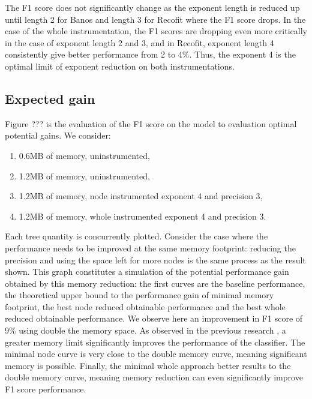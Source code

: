 \documentclass[conference]{IEEEtran}
\begin{document}
The F1 score does not significantly change as the exponent length is reduced up
until length 2 for Banos and length 3 for Recofit where the F1 score drops. In
the case of the whole instrumentation, the F1 scores are dropping even more
critically in the case of exponent length 2 and 3, and in Recofit, exponent
length 4 consistently give better performance from 2 to 4\%. Thus, the exponent
4 is the optimal limit of exponent reduction on both instrumentations.

\subsection{Expected gain}

Figure ??? is the evaluation of the F1 score on the model to evaluation optimal
potential gains. We consider:

\begin{enumerate}
    \item 0.6MB of memory, uninstrumented,
    \item 1.2MB of memory, uninstrumented,
    \item 1.2MB of memory, node instrumented exponent 4 and precision 3,
    \item 1.2MB of memory, whole instrumented exponent 4 and precision 3.
\end{enumerate}

Each tree quantity is concurrently plotted. Consider the case where the
performance needs to be improved at the same memory footprint: reducing the
precision and using the space left for more nodes is the same process as the
result shown. This graph constitutes a simulation of the potential performance
gain obtained by this memory reduction: the first curves are the baseline
performance, the theoretical upper bound to the performance gain of minimal
memory footprint, the best node reduced obtainable performance and the best
whole reduced obtainable performance.
We observe here an improvement in F1 score of 9\% using double the memory space.
As observed in the previous research \cite{khannouz2020benchmark}, a greater
memory limit significantly improves the performance of the classifier. The
minimal node curve is very close to the double memory curve, meaning significant
memory is possible. Finally, the minimal whole approach better results to the
double memory curve, meaning memory reduction can even significantly improve F1
score performance.
\end{document}
